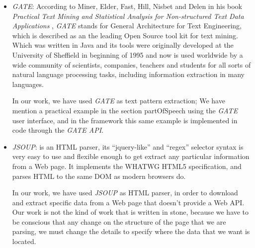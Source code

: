 \begin{itemize}
	\item \emph{GATE}\label{gate}: According to Miner, Elder, Fast, Hill, Nisbet and Delen in his book \emph{Practical Text Mining and Statistical Analysis for Non-structured Text Data Applications} \cite{G2014}, \emph{GATE} stands for General Architecture for Text Engineering, which is described as an the leading Open Source tool kit for text mining. Which was written in Java and its tools were originally developed at the University of Sheffield in beginning of 1995 and now is used worldwide by a wide community of scientists, companies, teachers and students for all sorts of natural language processing tasks, including information extraction in many languages. 
	
	In our work, we have used \emph{GATE} as text pattern extraction; We have mention a practical example in the section {partOfSpeech} using the \emph{GATE} user interface, and in the framework this same example is implemented in code through the \emph{GATE API}.
	
	\item \emph{JSOUP}: is an HTML parser, its “jquery-like” and “regex” selector syntax is very easy to use and flexible enough to get extract any particular information from a Web page. It implements the WHATWG HTML5 specification, and parses HTML to the same DOM as modern browsers do.
	
	In our work, we have used \emph{JSOUP} as HTML parser, in order to download and extract specific data from a Web page that doesn't provide a Web API. Our work is not the kind of work that is written in stone, because we have to be conscious that any change on the structure of the page that we are parsing, we must change the details to specify where the data that we want is located.
	 
\end{itemize}

